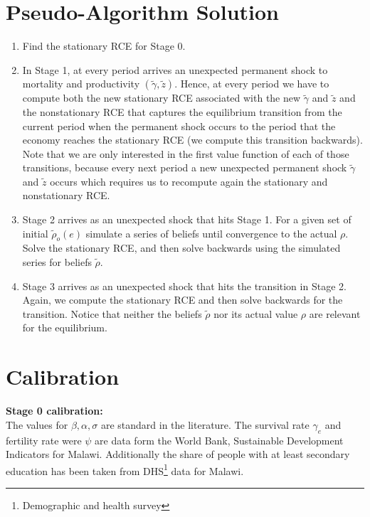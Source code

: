 \section{Pseudo-Algorithm Solution}
\begin{enumerate}
\item  Find the stationary RCE for Stage 0.
\item In Stage 1, at every period arrives an unexpected permanent shock to mortality and productivity $(\widetilde{\gamma}, \widetilde{z})$. Hence, at every period we have to compute both the new stationary RCE associated with the new $\widetilde{\gamma}$ and $\widetilde{z}$ and the nonstationary RCE that captures the equilibrium transition from the current period when the permanent shock occurs to the period that the economy reaches the stationary RCE (we compute this transition backwards). Note that we are only interested in the first value function of each of those transitions, because every next period a new unexpected permanent shock $\widetilde{\gamma}$ and $\widetilde{z}$ occurs which requires us to recompute again the stationary and nonstationary RCE.
\item Stage 2 arrives as an unexpected shock that hits Stage 1. For a given set of initial $\widetilde{\rho}_o(e)$ simulate a series of beliefs until convergence to the actual $\rho$. Solve the stationary RCE, and then solve backwards using the simulated series for beliefs $\widetilde{\rho}$.
\item Stage 3 arrives as an unexpected shock that hits the transition in Stage 2. Again, we compute the stationary RCE and then solve backwards for the transition. Notice that neither the beliefs $\widetilde{\rho}$ nor its actual value $\rho$ are relevant for the equilibrium.
\end{enumerate}


\clearpage
\section{Calibration}

\noindent \textbf{Stage 0 calibration:}\\


The values for $\beta, \alpha, \sigma$ are standard in the literature. The survival rate $\gamma_{e}$ and fertility rate were $\psi$ are data form the World Bank, Sustainable Development Indicators for Malawi. Additionally the share of people with at least secondary education has been taken from DHS\footnote{Demographic and health survey} data for Malawi.\\

